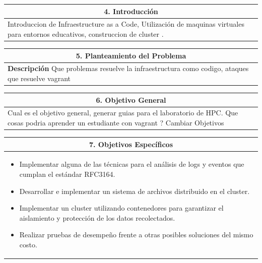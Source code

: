 \documentclass[letter,12pt]{article}
\begin{document}
\begin{center}
\begin{tabular}{|p{15.5cm}|}
\hline
\multicolumn{1}{|c|}{ \textbf{4. Introducción} }\\
\hline
Introduccion de Infraestructure as a Code, Utilización de maquinas virtuales para entornos educativos, construccion de cluster .\\
\hline
\end{tabular}
\end{center}
\begin{center}
\begin{tabular}{|p{15.5cm}|}
\hline
\multicolumn{1}{|c|}{ \textbf{5. Planteamiento del Problema} }\\
\hline
\textbf{Descripción}
Que problemas resuelve la infraestructura como codigo, ataques que resuelve vagrant\\
\hline
\end{tabular}
\end{center}

\begin{center}
\begin{tabular}{|p{15.5cm}|}
\hline
\multicolumn{1}{|c|}{ \textbf{6. Objetivo General}}\\
\hline
Cual es el objetivo general, generar guias para el laboratorio de HPC. 
Que cosas podria aprender un estudiante con vagrant ?
Cambiar Objetivos\\
\hline
\end{tabular}
\end{center}


\begin{center}
\begin{tabular}{|p{15.5cm}|}
\hline
\multicolumn{1}{|c|}{ \textbf{7. Objetivos Específicos}}\\
\hline
\begin{itemize}
	\item Implementar alguna de las técnicas para el análisis de logs y eventos que cumplan el estándar RFC3164.
	\item Desarrollar e implementar un sistema de archivos distribuido en el cluster.
	\item Implementar un cluster utilizando contenedores para garantizar el aislamiento y protección de los datos recolectados.
    \item Realizar pruebas de desempeño frente a otras posibles soluciones del mismo costo.
\end{itemize} \\
\hline
\end{tabular}
\end{center}
\end{document}
